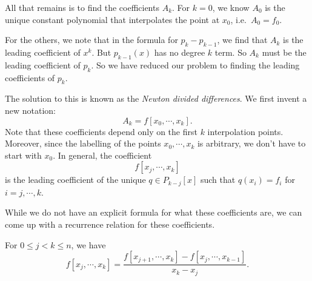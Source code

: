 \documentclass[a4paper]{article}
\begin{document}
All that remains is to find the coefficients $A_k$. For $k = 0$, we know $A_0$ is the unique constant polynomial that interpolates the point at $x_0$, i.e.\ $A_0 = f_0$.

For the others, we note that in the formula for $p_k - p_{k - 1}$, we find that $A_k$ is the leading coefficient of $x^k$. But $p_{k - 1}(x)$ has no degree $k$ term. So $A_k$ must be the leading coefficient of $p_k$. So we have reduced our problem to finding the leading coefficients of $p_k$.

The solution to this is known as the \emph{Newton divided differences}. We first invent a new notation:
\[
  A_k = f[x_0, \cdots, x_k].
\]
Note that these coefficients depend only on the first $k$ interpolation points. Moreover, since the labelling of the points $x_0, \cdots, x_k$ is arbitrary, we don't have to start with $x_0$. In general, the coefficient
\[
  f[x_j, \cdots, x_k]
\]
is the leading coefficient of the unique $q \in P_{k - j}[x]$ such that $q(x_i) = f_i$ for $i = j, \cdots, k$.

While we do not have an explicit formula for what these coefficients are, we can come up with a recurrence relation for these coefficients.

\begin{thm}
  For $0 \leq j < k \leq n$, we have
  \[
    f[x_j, \cdots, x_k] = \frac{f[x_{j + 1}, \cdots, x_k] - f[x_j, \cdots, x_{k - 1}]}{x_k - x_j}.
  \]
\end{thm}
\end{document}
